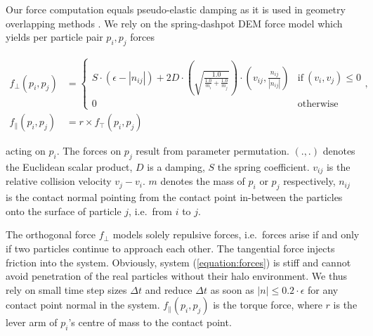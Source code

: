 %
%

Our force computation equals pseudo-elastic damping as it is used in
geometry overlapping methods \cite{Boac2014}.
We rely on the spring-dashpot DEM force model \cite{Cundall1979}
which yields per particle pair $p_i, p_j$ forces 

\begin{align} 
  f_{\bot}(p_i,p_j) &=
  \left\{
   \begin{array}{ll}
    S \cdot (\epsilon - |n_{ij}|) +2D \cdot \left(\sqrt{\frac{1.0}{\frac{1.0}{m_i} + \frac{1.0}{m_j}}}\right) \cdot (v_{ij},\frac{n_{ij}}{|n_{ij}|}) 
    &
    \mbox{if}\ (v_{i},v_{j})\leq 0 \\
    0 & \mbox{otherwise}
   \end{array}
  \right.,
  \nonumber
  \\
  f_{\parallel}(p_i,p_j) &= r \times f_{\top}(p_i,p_j)
    \label{equation:forces}
\end{align}



\noindent
acting on $p_i$. 
The forces on $p_j$ result from parameter permutation.
$(.,.)$ denotes the Euclidean scalar product, 
$D$ is a damping, $S$ the spring coefficient.
$v_{ij}$ is the relative collision velocity $v_j-v_i$.
$m$ denotes the mass of $p_i$ or $p_j$ respectively, $n_{ij}$ is the contact
normal pointing from the contact point in-between the particles onto the surface of particle $j$, i.e.~from $i$ to $j$.

The orthogonal force $f_{\bot}$ models solely repulsive forces, i.e.~forces
arise if and only if two particles continue to approach each other. 
The tangential force injects friction into the system.
Obviously, system (\ref{equation:forces}) is stiff and cannot avoid penetration
of the real particles without their halo environment.
We thus rely on small time step sizes $\Delta t$ and reduce $\Delta t$ as soon
as $|n| \leq 0.2 \cdot \epsilon $ for any contact point normal in the system.
$f_{\parallel}(p_i,p_j)$ is the torque force, where $r$ is the lever arm of $p_i$'s
centre of mass to the contact point.

